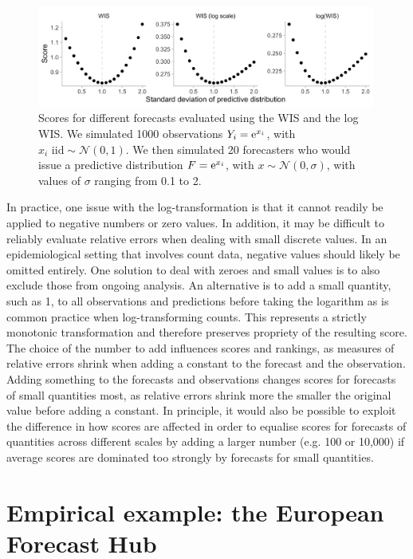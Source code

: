 \documentclass{article}
\begin{document}
\begin{figure}[h!]
    \centering
    \includegraphics[width=0.99\textwidth]{output/figures/example-log-first.png}
    \caption{Scores for different forecasts evaluated using the WIS and the log WIS. We simulated 1000 observations $Y_i = {\rm e}^{x_i}$, with $x_i \text{ iid} \sim \mathcal{N}(0, 1)$. We then simulated 20 forecasters who would issue a predictive distribution $F = {\rm e}^{x_i}$, with $x \sim \mathcal{N}(0, \sigma)$, with values of $\sigma$ ranging from 0.1 to 2.}
    \label{fig:log-improper}
\end{figure}

In practice, one issue with the log-transformation is that it cannot readily be applied to negative numbers or zero values. In addition, it may be difficult to reliably evaluate relative errors when dealing with small discrete values. In an epidemiological setting that involves count data, negative values should likely be omitted entirely. One solution to deal with zeroes and small values is to also exclude those from ongoing analysis. An alternative is to add a small quantity, such as 1, to all observations and predictions before taking the logarithm as is common practice when log-transforming counts. This represents a strictly monotonic transformation and therefore preserves propriety of the resulting score. The choice of the number to add influences scores and rankings, as measures of relative errors shrink when adding a constant to the forecast and the observation. Adding something to the forecasts and observations changes scores for forecasts of small quantities most, as relative errors shrink more the smaller the original value before adding a constant. In principle, it would also be possible to exploit the difference in how scores are affected in order to equalise scores for forecasts of quantities across different scales by adding a larger number (e.g. 100 or 10,000) if average scores are dominated too strongly by forecasts for small quantities. 



\section{Empirical example: the European Forecast Hub}
\label{sec:results}
\end{document}
